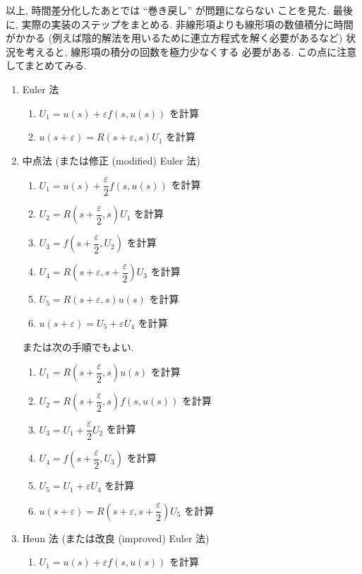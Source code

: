 \documentclass[12pt, a4j]{jsarticle}
\newcommand{\e}{\varepsilon}
\begin{document}
以上, 時間差分化したあとでは ``巻き戻し'' が問題にならない
ことを見た. 最後に, 実際の実装のステップをまとめる.
非線形項よりも線形項の数値積分に時間がかかる
(例えば陰的解法を用いるために連立方程式を解く必要があるなど)
状況を考えると, 線形項の積分の回数を極力少なくする
必要がある. この点に注意してまとめてみる.

\begin{enumerate}[label=(\arabic*)]
 \item Euler 法
  \begin{enumerate}[label={Step\arabic{*}.}]
   \item $U_{1} = u(s) + \e f(s, u(s))$ を計算
   \item $u(s + \e) = R(s + \e, s) U_{1}$ を計算
  \end{enumerate}
 \item 中点法 (または修正 (modified) Euler 法)
  \begin{enumerate}[label={Step\arabic{*}.}]
   \item $U_{1} = u(s) + \dfrac{\e}{2} f(s, u(s))$ を計算
   \item $U_{2} = R\left(s + \dfrac{\e}{2}, s\right) U_{1}$ を計算
   \item $U_{3} = f\left(s + \dfrac{\e}{2}, U_{2}\right)$ を計算
   \item $U_{4} = R\left(s + \e, s + \dfrac{\e}{2}\right) U_{3}$
	 を計算
   \item $U_{5} = R(s + \e, s) u(s)$ を計算
   \item $u(s + \e) = U_{5} + \e U_{4}$ を計算
  \end{enumerate}
  または次の手順でもよい.
  \begin{enumerate}[label={Step\arabic{*}.}]
   \item $U_{1} = R\left(s + \dfrac{\e}{2}, s\right) u(s)$ を計算
   \item $U_{2} = R\left(s + \dfrac{\e}{2}, s\right) f(s, u(s))$
	 を計算
   \item $U_{3} = U_{1} + \dfrac{\e}{2} U_{2}$ を計算
   \item $U_{4} = f\left(s + \dfrac{\e}{2}, U_{3}\right)$ を計算
   \item $U_{5} = U_{1} + \e U_{4}$ を計算
   \item $u(s + \e) = R\left(s + \e, s + \dfrac{\e}{2}\right) U_{5}$
	 を計算
  \end{enumerate}
 \item Heun 法 (または改良 (improved) Euler 法)
  \begin{enumerate}[label={Step\arabic{*}.}]
   \item $U_{1} = u(s) + \e f(s, u(s))$ を計算

\end{enumerate}
\end{enumerate}
\end{document}
